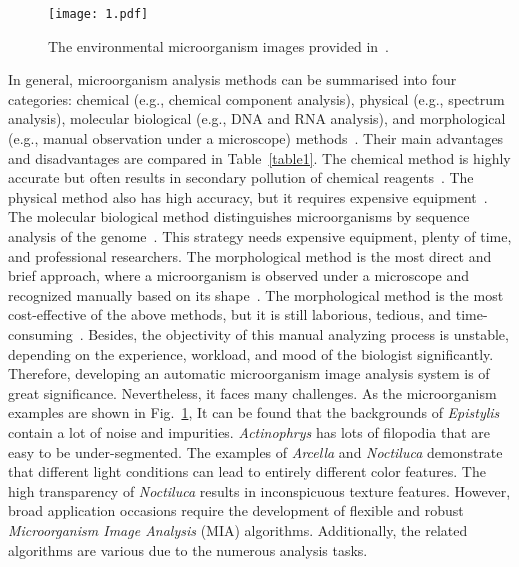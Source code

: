 \begin{figure}[htbp!]
\centering
\texttt{[image: 1.pdf]}
\caption{The environmental microorganism images provided in~\cite{Li-2021-EMDS}.}
\label{fig1}
\end{figure}

In general, microorganism analysis methods can be summarised into four categories: chemical (e.g., chemical component analysis), physical (e.g., spectrum analysis), molecular biological (e.g., DNA and RNA analysis), and morphological (e.g., manual observation under a microscope) methods~\cite{Li-2019-ASAC}. Their main advantages and disadvantages are compared in Table~\ref{table1}. The chemical method is highly accurate but often results in secondary pollution of chemical reagents~\cite{Li-2019-ASAC}. The physical method also has high accuracy, but it requires expensive equipment~\cite{Li-2019-ASAC}. The molecular biological method distinguishes microorganisms by sequence analysis of the genome~\cite{Yamaguchi-2015-SDCR}. This strategy needs expensive equipment, plenty of time, and professional researchers. The morphological method is the most direct and brief approach, where a microorganism is observed under a microscope and recognized manually based on its shape~\cite{Pepper-2011-EM}. The morphological method is the most cost-effective of the above methods, but it is still laborious, tedious, and time-consuming~\cite{Zhang-2020-AMCF}. Besides, the objectivity of this manual analyzing process is unstable, depending on the experience, workload, and mood of the biologist significantly. Therefore, developing an automatic microorganism image analysis system is of great significance. Nevertheless, it faces many challenges. As the microorganism examples are shown in Fig.~\ref{fig1}, It can be found that the backgrounds of \emph{Epistylis} contain a lot of noise and impurities. \emph{Actinophrys} has lots of filopodia that are easy to be under-segmented. The examples of \emph{Arcella} and \emph{Noctiluca} demonstrate that different light conditions can lead to entirely different color features. The high transparency of \emph{Noctiluca} results in inconspicuous texture features. However, broad application occasions require the development of flexible and robust \emph{Microorganism Image Analysis} (MIA) algorithms. Additionally, the related algorithms are various due to the numerous analysis tasks.


